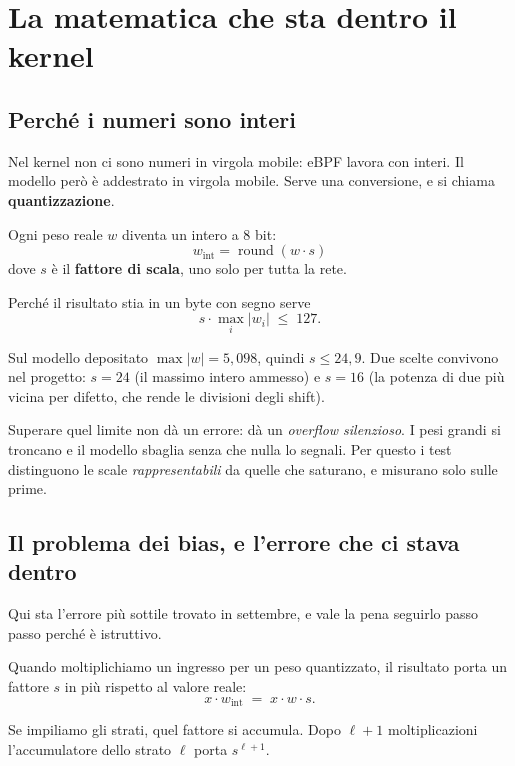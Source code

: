 \documentclass[11pt,a4paper,oneside]{report}
\begin{document}
\chapter{La matematica che sta dentro il kernel}

\section{Perché i numeri sono interi}

Nel kernel non ci sono numeri in virgola mobile: eBPF lavora con interi. Il
modello però è addestrato in virgola mobile. Serve una conversione, e si chiama
\textbf{quantizzazione}.

Ogni peso reale $w$ diventa un intero a 8 bit:
\[
  w_{\text{int}} = \operatorname{round}(w \cdot s)
\]
dove $s$ è il \textbf{fattore di scala}, uno solo per tutta la rete.

Perché il risultato stia in un byte con segno serve
\[
  s \cdot \max_i |w_i| \;\le\; 127 .
\]

Sul modello depositato $\max|w| = 5{,}098$, quindi $s \le 24{,}9$. Due scelte
convivono nel progetto: $s = 24$ (il massimo intero ammesso) e $s = 16$ (la
potenza di due più vicina per difetto, che rende le divisioni degli shift).

\begin{lezione}
Superare quel limite non dà un errore: dà un \emph{overflow silenzioso}. I pesi
grandi si troncano e il modello sbaglia senza che nulla lo segnali. Per questo i
test distinguono le scale \emph{rappresentabili} da quelle che saturano, e
misurano solo sulle prime.
\end{lezione}

\section{Il problema dei bias, e l'errore che ci stava dentro}

Qui sta l'errore più sottile trovato in settembre, e vale la pena seguirlo
passo passo perché è istruttivo.

Quando moltiplichiamo un ingresso per un peso quantizzato, il risultato porta
un fattore $s$ in più rispetto al valore reale:
\[
  x \cdot w_{\text{int}} \;=\; x \cdot w \cdot s .
\]

Se impiliamo gli strati, quel fattore si accumula. Dopo $\ell+1$ moltiplicazioni
l'accumulatore dello strato $\ell$ porta $s^{\ell+1}$.
\end{document}
